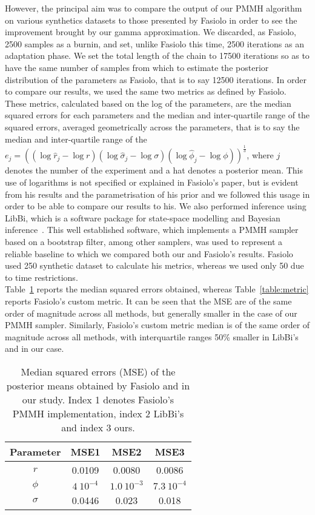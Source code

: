 \documentclass[12pt]{article}
\newcommand{\ra}[1]{\renewcommand{\arraystretch}{#1}}
\begin{document}
	However, the principal aim was to compare the output of our PMMH algorithm on various synthetics datasets to those presented by Fasiolo in order to see the improvement brought by our gamma approximation. We discarded, as Fasiolo, 2500 samples as a burnin, and set, unlike Fasiolo this time, 2500 iterations as an adaptation phase. We set the total length of the chain to 17500 iterations so as to have the same number of samples from which to estimate the posterior distribution of the parameters as Fasiolo, that is to say 12500 iterations. In order to compare our results, we used the same two metrics as defined by Fasiolo. These metrics, calculated based on the log of the parameters, are the median squared errors for each parameters and the median and inter-quartile range of the squared errors, averaged geometrically across the parameters, that is to say the median and inter-quartile range of the $e_j = ((\log\hat{ r}_j-\log r)(\log\hat{\sigma}_j-\log\sigma)(\log\hat{\phi}_j-\log\phi))^\frac{1}{3}$, where $j$ denotes the number of the experiment and a hat denotes a posterior mean. This use of logarithms is not specified or explained in Fasiolo's paper, but is evident from his results and the parametrisation of his prior and we followed this usage in order to be able to compare our results to his. We also performed inference using LibBi, which is a software package for state-space modelling and Bayesian inference~\cite{murray2013bayesian}. This well established software, which implements a PMMH sampler based on a bootstrap filter, among other samplers, was used to represent a reliable baseline to which we compared both our and Fasiolo's results. Fasiolo used 250 synthetic dataset to calculate his metrics, whereas we used only 50 due to time restrictions. \\
	Table~\ref{table:mse} reports the median squared errors obtained, whereas Table~\ref{table:metric} reports Fasiolo's custom metric. It can be seen that the MSE are of the same order of magnitude across all methods, but generally smaller in the case of our PMMH sampler. Similarly, Fasiolo's custom metric median is of the same order of magnitude across all methods, with interquartile ranges 50\% smaller in LibBi's and in our case.
	
	\begin{table}[htb]
		\centering
		\vspace{10mm}
		\ra{1.3}
		\begin{tabular}{@{}cccc@{}} \toprule
			Parameter & MSE1 & MSE2 & MSE3\\ \midrule 
			$r$ & 0.0109 & 0.0080 &  0.0086 \\ 
			$\phi$ & $4 \ 10^{-4}$ & $1.0 \ 10^{-3}$ &  $7.3 \ 10^{-4}$ \\ 
			$\sigma$ & 0.0446 & 0.023 & 0.018  \\ \bottomrule
		\end{tabular}
		\caption[Comparison between the mean square errors of posterior estimates of the parameters obtain in this study and in Fasiolo's ]{Median squared errors (MSE) of the posterior means obtained by Fasiolo and in our study. Index 1 denotes Fasiolo's PMMH implementation, index 2 LibBi's and index 3 ours.}
		\label{table:mse}
	\end{table}
	
\end{document}
